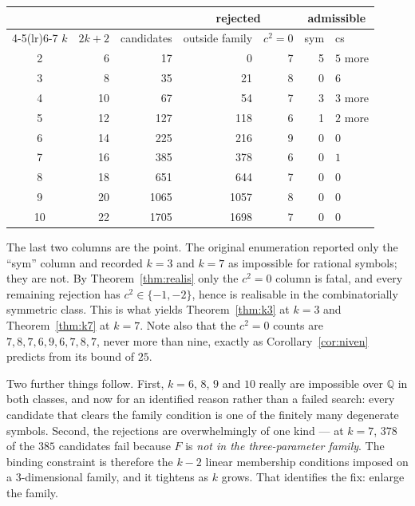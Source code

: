 \documentclass[11pt]{article}
\theoremstyle{definition}
\begin{document}
\begin{center}\small
\begin{tabular}{crrrrrl}
\toprule
& & & \multicolumn{2}{c}{rejected} & \multicolumn{2}{c}{admissible}\\
\cmidrule(lr){4-5}\cmidrule(lr){6-7}
$k$ & $2k+2$ & candidates & outside family & $c^{2}=0$ & sym & cs \\
\midrule
2  & 6  & 17   & 0    & 7 & 5 & $5$ more \\
3  & 8  & 35   & 21   & 8 & 0 & $6$ \\
4  & 10 & 67   & 54   & 7 & 3 & $3$ more \\
5  & 12 & 127  & 118  & 6 & 1 & $2$ more \\
6  & 14 & 225  & 216  & 9 & 0 & 0 \\
7  & 16 & 385  & 378  & 6 & 0 & $1$ \\
8  & 18 & 651  & 644  & 7 & 0 & 0 \\
9  & 20 & 1065 & 1057 & 8 & 0 & 0 \\
10 & 22 & 1705 & 1698 & 7 & 0 & 0 \\
\bottomrule
\end{tabular}
\end{center}

\noindent
The last two columns are the point. The original enumeration reported only the
``sym'' column and recorded $k=3$ and $k=7$ as impossible for rational symbols;
they are not. By Theorem~\ref{thm:realis} only the $c^{2}=0$ column is fatal,
and every remaining rejection has $c^{2}\in\{-1,-2\}$, hence is realisable in
the combinatorially symmetric class. This is what yields Theorem~\ref{thm:k3}
at $k=3$ and Theorem~\ref{thm:k7} at $k=7$. Note also that the $c^{2}=0$
counts are $7,8,7,6,9,6,7,8,7$, never more than nine, exactly as
Corollary~\ref{cor:niven} predicts from its bound of $25$.

Two further things follow. First, $k=6$, $8$, $9$ and $10$ really are
impossible over $\mathbb Q$ in both classes, and now for an identified reason
rather than a failed search: every candidate that clears the family condition
is one of the finitely many degenerate symbols. Second, the rejections are
overwhelmingly of one kind --- at $k=7$, $378$ of the $385$ candidates fail
because $F$ is \emph{not in the three-parameter family}. The binding constraint
is therefore the $k-2$ linear membership conditions imposed on a
$3$-dimensional family, and it tightens as $k$ grows. That identifies the fix:
enlarge the family.
\end{document}
